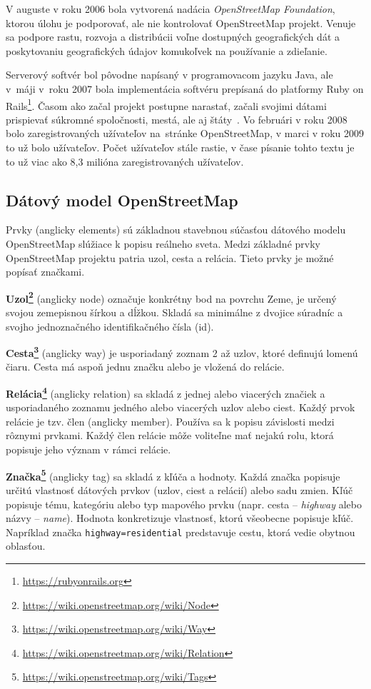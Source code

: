 V auguste v roku 2006 bola vytvorená nadácia \emph{OpenStreetMap Foundation}, ktorou úlohu je podporovať, ale nie kontrolovať OpenStreetMap projekt. Venuje sa podpore rastu, rozvoja a distribúcii voľne dostupných geografických dát a poskytovaniu geografických údajov komukoľvek na používanie a zdieľanie.

Serverový softvér bol pôvodne napísaný v programovacom jazyku Java, ale v~máji v~roku 2007 bola implementácia softvéru prepísaná do platformy Ruby on Rails\footnote{\url{https://rubyonrails.org}}. Časom ako začal projekt postupne narastať, začali svojimi dátami prispievať súkromné spoločnosti, mestá, ale aj štáty~\cite{bennett2010openstreetmap}. Vo februári v roku 2008 bolo zaregistrovaných  užívateľov na~stránke OpenStreetMap, v marci v roku 2009 to už bolo  užívateľov. Počet užívateľov stále rastie, v čase písanie tohto textu je to už viac ako 8,3 milióna zaregistrovaných užívateľov.

\subsection*{Dátový model OpenStreetMap}
Prvky (anglicky elements) sú základnou stavebnou súčasťou dátového modelu OpenStreetMap slúžiace k popisu reálneho sveta. Medzi základné prvky OpenStreetMap projektu patria uzol, cesta a relácia. Tieto prvky je možné popísať značkami.

\textbf{Uzol\footnote{\url{https://wiki.openstreetmap.org/wiki/Node}}} (anglicky node) označuje konkrétny bod na povrchu Zeme, je určený svojou zemepisnou šírkou a dĺžkou. Skladá sa minimálne z dvojice súradníc a svojho jednoznačného identifikačného čísla (id).

\textbf{Cesta\footnote{\url{https://wiki.openstreetmap.org/wiki/Way}}} (anglicky way) je usporiadaný zoznam 2 až  uzlov, ktoré definujú lomenú čiaru. Cesta má aspoň jednu značku alebo je vložená do relácie.

\textbf{Relácia\footnote{\url{https://wiki.openstreetmap.org/wiki/Relation}}} (anglicky relation) sa skladá z jednej alebo viacerých značiek a usporiadaného zoznamu jedného alebo viacerých uzlov alebo ciest. Každý prvok relácie je tzv. člen (anglicky member). Používa sa k popisu závislosti medzi rôznymi prvkami. Každý člen relácie môže voliteľne mať nejakú rolu, ktorá popisuje jeho význam v rámci relácie.

\textbf{Značka\footnote{\url{https://wiki.openstreetmap.org/wiki/Tags}}} (anglicky tag) sa skladá z kľúča a hodnoty. Každá značka popisuje určitú vlastnosť dátových prvkov (uzlov, ciest a relácií) alebo sadu zmien. Kľúč popisuje tému, kategóriu alebo typ mapového prvku (napr. cesta \--- \emph{highway} alebo názvy \--- \emph{name}). Hodnota konkretizuje vlastnosť, ktorú všeobecne popisuje kľúč. Napríklad značka \texttt{highway=residential} predstavuje cestu, ktorá vedie obytnou oblasťou.

